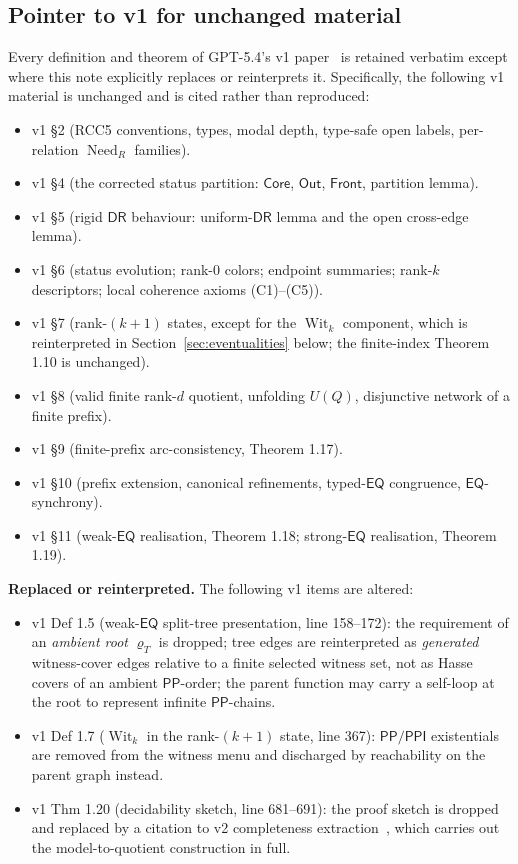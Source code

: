 \documentclass[11pt]{article}
\theoremstyle{definition}
\theoremstyle{remark}
\newcommand{\DR}{\mathsf{DR}}
\newcommand{\PP}{\mathsf{PP}}
\newcommand{\PPI}{\mathsf{PPI}}
\newcommand{\EQ}{\mathsf{EQ}}
\newcommand{\Wit}{\operatorname{Wit}}
\newcommand{\Need}{\operatorname{Need}}
\newcommand{\Core}{\mathsf{Core}}
\newcommand{\Out}{\mathsf{Out}}
\newcommand{\Front}{\mathsf{Front}}
\begin{document}
\subsection{Pointer to v1 for unchanged material}

Every definition and theorem of GPT-5.4's v1 paper~\cite{SiblingV1}
is retained verbatim except where this note explicitly replaces or
reinterprets it. Specifically, the following v1 material is
unchanged and is cited rather than reproduced:

\begin{itemize}
\item v1 \S2 (RCC5 conventions, types, modal depth, type-safe open
  labels, per-relation $\Need_R$ families).
\item v1 \S4 (the corrected status partition: $\Core$, $\Out$,
  $\Front$, partition lemma).
\item v1 \S5 (rigid $\DR$ behaviour: uniform-$\DR$ lemma and the
  open cross-edge lemma).
\item v1 \S6 (status evolution; rank-0 colors; endpoint summaries;
  rank-$k$ descriptors; local coherence axioms (C1)--(C5)).
\item v1 \S7 (rank-$(k+1)$ states, except for the
  $\Wit_k$ component, which is reinterpreted in
  Section~\ref{sec:eventualities} below; the finite-index
  Theorem 1.10 is unchanged).
\item v1 \S8 (valid finite rank-$d$ quotient, unfolding $U(Q)$,
  disjunctive network of a finite prefix).
\item v1 \S9 (finite-prefix arc-consistency, Theorem 1.17).
\item v1 \S10 (prefix extension, canonical refinements,
  typed-$\EQ$ congruence, $\EQ$-synchrony).
\item v1 \S11 (weak-$\EQ$ realisation, Theorem 1.18; strong-$\EQ$
  realisation, Theorem 1.19).
\end{itemize}

\noindent\textbf{Replaced or reinterpreted.}\;
The following v1 items are altered:

\begin{itemize}
\item v1 Def 1.5 (weak-$\EQ$ split-tree presentation, line 158--172):
  the requirement of an \emph{ambient root}
  $\varrho_T$ is dropped; tree edges are reinterpreted as
  \emph{generated} witness-cover edges relative to a
  finite selected witness set, not as Hasse covers of an ambient
  $\PP$-order; the parent function may carry a self-loop at the root
  to represent infinite $\PP$-chains.
\item v1 Def 1.7 ($\Wit_k$ in the rank-$(k+1)$ state, line 367):
  $\PP/\PPI$ existentials are removed from the witness menu and
  discharged by reachability on the parent graph instead.
\item v1 Thm 1.20 (decidability sketch, line 681--691): the
  proof sketch is dropped and replaced by a citation to v2
  completeness extraction~\cite{CompletenessV2}, which carries out
  the model-to-quotient construction in full.
\end{itemize}
\end{document}
